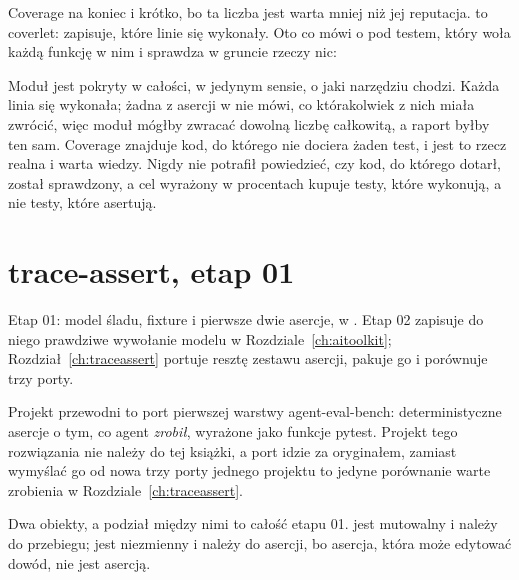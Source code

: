 
\noindent
Coverage na koniec i krótko, bo ta liczba jest warta mniej niż jej reputacja.
 to coverlet: zapisuje, które linie się wykonały. Oto co mówi o
 pod testem, który woła każdą funkcję w nim i
sprawdza w gruncie rzeczy nic:


\noindent
Moduł jest pokryty w całości, w jedynym sensie, o jaki narzędziu chodzi.
Każda linia się wykonała; żadna z asercji w
 nie mówi, co którakolwiek z nich miała
zwrócić, więc moduł mógłby zwracać dowolną liczbę całkowitą, a raport
byłby ten sam. Coverage znajduje kod, do którego nie dociera żaden test, i
jest to rzecz realna i warta wiedzy. Nigdy nie potrafił powiedzieć, czy kod,
do którego dotarł, został sprawdzony, a cel wyrażony w procentach kupuje
testy, które wykonują, a nie testy, które asertują.

\section{trace-assert, etap 01}
\label{sec:testing-traceassert}

\begin{projectbox}
Etap 01: model śladu, fixture  i pierwsze dwie asercje, w
. Etap 02 zapisuje do niego prawdziwe
wywołanie modelu w Rozdziale~\ref{ch:aitoolkit};
Rozdział~\ref{ch:traceassert} portuje resztę zestawu asercji, pakuje go i
porównuje trzy porty.
\end{projectbox}

\noindent
Projekt przewodni to port pierwszej warstwy agent-eval-bench:
deterministyczne asercje o tym, co agent \emph{zrobił}, wyrażone jako
funkcje pytest. Projekt tego rozwiązania nie należy do tej książki, a port
idzie za oryginałem, zamiast wymyślać go od nowa \dash{} trzy porty jednego
projektu to jedyne porównanie warte zrobienia w
Rozdziale~\ref{ch:traceassert}.

Dwa obiekty, a podział między nimi to całość etapu 01.  jest
mutowalny i należy do przebiegu;  jest niezmienny i należy do
asercji, bo asercja, która może edytować dowód, nie jest asercją.


